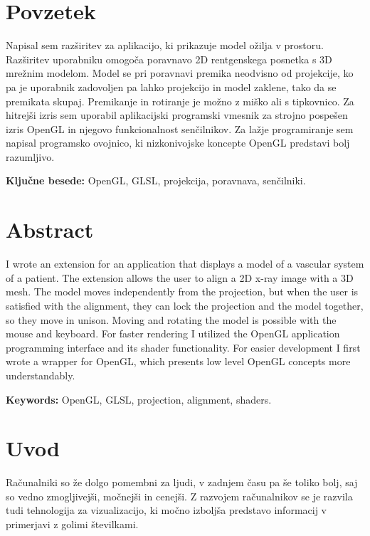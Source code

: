 \documentclass[a4paper, 12pt]{book}
\newcommand{\tkeywords}{OpenGL, GLSL, projekcija, poravnava, senčilniki}
\newcommand{\tkeywordsEn}{OpenGL, GLSL, projection, alignment, shaders}
\newcommand{\clearemptydoublepage}{\newpage{\pagestyle{empty}\cleardoublepage}}
\begin{document}
\clearemptydoublepage

\chapter*{Povzetek}
Napisal sem razširitev za aplikacijo, ki prikazuje model ožilja v prostoru. Razširitev uporabniku omogoča poravnavo 2D rentgenskega posnetka s 3D mrežnim modelom. Model se pri poravnavi premika neodvisno od projekcije, ko pa je uporabnik zadovoljen pa lahko projekcijo in model zaklene, tako da se premikata skupaj. Premikanje in rotiranje je možno z miško ali s tipkovnico. Za hitrejši izris sem uporabil aplikacijski programski vmesnik za strojno pospešen izris OpenGL in njegovo funkcionalnost senčilnikov. Za lažje programiranje sem napisal programsko ovojnico, ki nizkonivojske koncepte OpenGL predstavi bolj razumljivo. 

\bigskip

\noindent\textbf{Ključne besede: } \tkeywords.
\clearemptydoublepage

\chapter*{Abstract}
I wrote an extension for an application that displays a model of a vascular system of a patient. The extension allows the user to align a 2D x-ray image with a 3D mesh. The model moves independently from the projection, but when the user is satisfied with the alignment, they can lock the projection and the model together, so they move in unison. Moving and rotating the model is possible with the mouse and keyboard. For faster rendering I utilized the OpenGL application programming interface and its shader functionality. For easier development I first wrote a wrapper for OpenGL, which presents low level OpenGL concepts more understandably.
\bigskip

\noindent\textbf{Keywords:} \tkeywordsEn.
\clearemptydoublepage

\mainmatter
\setcounter{page}{1}
\pagestyle{fancy}

\chapter{Uvod}
Računalniki so že dolgo pomembni za ljudi, v zadnjem času pa še toliko bolj, saj so vedno zmogljivejši, močnejši in cenejši. Z razvojem računalnikov se je razvila tudi tehnologija za vizualizacijo, ki močno izboljša predstavo informacij v primerjavi z golimi številkami. 
\end{document}
